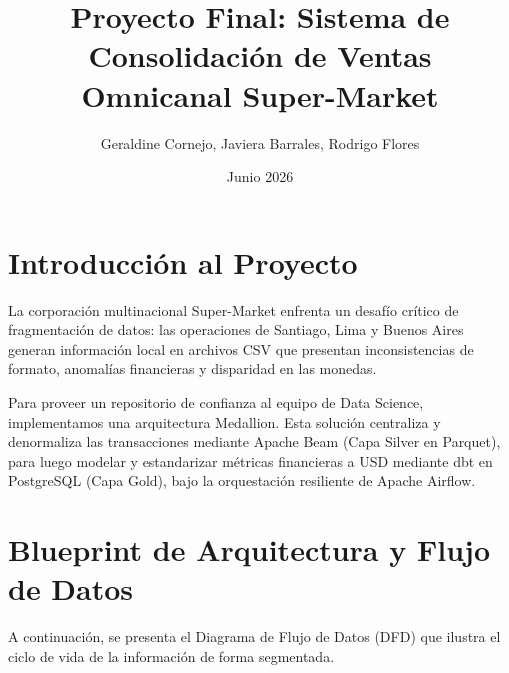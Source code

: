 \documentclass[11pt,a4paper]{article}
\title{Proyecto Final: Sistema de Consolidación de Ventas Omnicanal Super-Market}
\author{Geraldine Cornejo, Javiera Barrales, Rodrigo Flores}
\date{Junio 2026}
\begin{document}
\maketitle

\section{Introducción al Proyecto}

La corporación multinacional Super-Market enfrenta un desafío crítico de fragmentación de datos: las operaciones de Santiago, Lima y Buenos Aires generan información local en archivos CSV que presentan inconsistencias de formato, anomalías financieras y disparidad en las monedas. 

Para proveer un repositorio de confianza al equipo de Data Science, implementamos una arquitectura Medallion. Esta solución centraliza y denormaliza las transacciones mediante Apache Beam (Capa Silver en Parquet), para luego modelar y estandarizar métricas financieras a USD mediante dbt en PostgreSQL (Capa Gold), bajo la orquestación resiliente de Apache Airflow.

\section{Blueprint de Arquitectura y Flujo de Datos}

A continuación, se presenta el Diagrama de Flujo de Datos (DFD) que ilustra el ciclo de vida de la información de forma segmentada.
\end{document}
